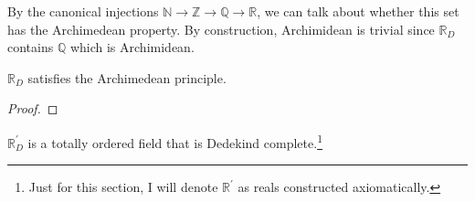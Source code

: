   By the canonical injections $\mathbb{N} \rightarrow \mathbb{Z} \rightarrow \mathbb{Q} \rightarrow \mathbb{R}$, we can talk about whether this set has the Archimedean property. By construction, Archimidean is trivial since $\mathbb{R}_D$ contains $\mathbb{Q}$ which is Archimidean. 

  \begin{theorem}
    $\mathbb{R}_D$ satisfies the Archimedean principle. 
  \end{theorem}
  \begin{proof}
    
  \end{proof}

  \begin{definition}
    $\mathbb{R}_D^\prime$ is a totally ordered field that is Dedekind complete.\footnote{Just for this section, I will denote $\mathbb{R}^\prime$ as reals constructed axiomatically.}
  \end{definition}

